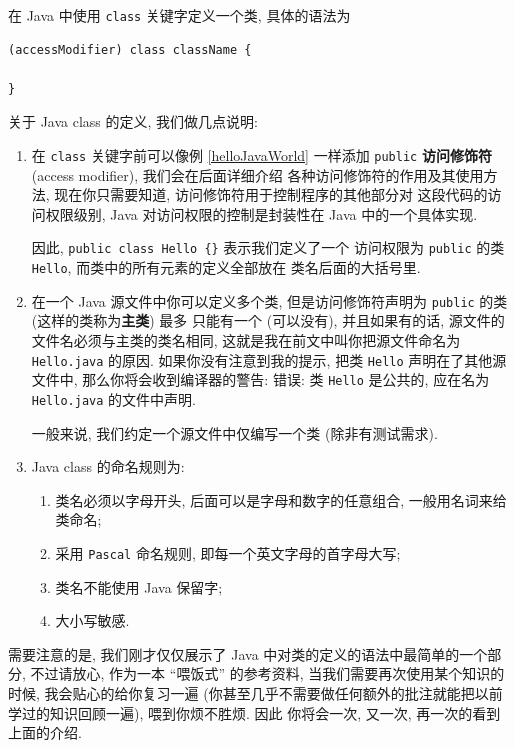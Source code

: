 \documentclass[10pt,UTF8]{book} %
\begin{document}
在 Java 中使用 \lstinline|class|
关键字定义一个类, 具体的语法为
\begin{lstlisting}
(accessModifier) class className {

}
\end{lstlisting}
关于 Java class 的定义, 我们做几点说明:
\begin{enumerate}
    \item 在 \lstinline|class| 关键字前可以像例 \ref{helloJavaWorld} 一样添加 
    \lstinline|public| \textbf{访问修饰符} (access modifier), 我们会在后面详细介绍
    各种访问修饰符的作用及其使用方法, 现在你只需要知道, 访问修饰符用于控制程序的其他部分对
    这段代码的访问权限级别, Java 对访问权限的控制是封装性在 Java 中的一个具体实现.

    因此, \lstinline|public class Hello {}| 表示我们定义了一个
    访问权限为 \lstinline|public| 的类 \lstinline|Hello|, 而类中的所有元素的定义全部放在
    类名后面的大括号里.

    \item 在一个 Java 源文件中你可以定义多个类, 
    但是访问修饰符声明为 \lstinline|public| 的类 (这样的类称为\textbf{主类}) 最多
    只能有一个 (可以没有), 并且如果有的话, 源文件的文件名必须与主类的类名相同, 
    这就是我在前文中叫你把源文件命名为 \lstinline|Hello.java| 的原因.
    如果你没有注意到我的提示,
    把类 \lstinline|Hello| 声明在了其他源文件中, 那么你将会收到编译器的警告:
    \kaishu 错误: 类 \lstinline|Hello| 是公共的,
    应在名为 \lstinline|Hello.java| 的文件中声明. \songti

    一般来说, 我们约定一个源文件中仅编写一个类 (除非有测试需求).

    \item Java class 的命名规则为:
    \begin{enumerate}
        \item 类名必须以字母开头, 后面可以是字母和数字的任意组合, 一般用名词来给类命名;
        \item 采用 \lstinline|Pascal| 命名规则, 即每一个英文字母的首字母大写;
        \item 类名不能使用 Java 保留字;
        \item 大小写敏感.
    \end{enumerate}
\end{enumerate}

需要注意的是, 我们刚才仅仅展示了 Java 中对类的定义的语法中最简单的一个部分, 不过请放心,
作为一本 “喂饭式” 的参考资料, 当我们需要再次使用某个知识的时候, 我会贴心的给你复习一遍
(你甚至几乎不需要做任何额外的批注就能把以前学过的知识回顾一遍), 喂到你烦不胜烦. 因此
你将会一次, 又一次, 再一次的看到上面的介绍.
\end{document}
